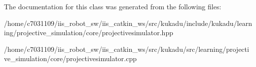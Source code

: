 The documentation for this class was generated from the following files\-:\begin{DoxyCompactItemize}
\item 
/home/c7031109/iis\-\_\-robot\-\_\-sw/iis\-\_\-catkin\-\_\-ws/src/kukadu/include/kukadu/learning/projective\-\_\-simulation/core/projectivesimulator.\-hpp\item 
/home/c7031109/iis\-\_\-robot\-\_\-sw/iis\-\_\-catkin\-\_\-ws/src/kukadu/src/learning/projective\-\_\-simulation/core/projectivesimulator.\-cpp\end{DoxyCompactItemize}
